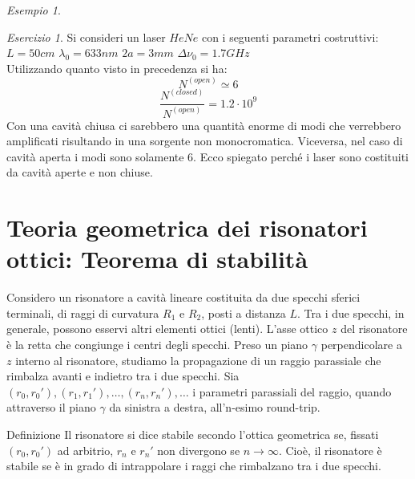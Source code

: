 \documentclass{book}
\def \D {\Delta}
\def \l {\lambda}
\theoremstyle{remark}
\newtheorem{example}{Esempio}[section]
\newtheorem{exercise}{Esercizio}[chapter]
\begin{document}
\begin{example}
\begin{exercise}
Si consideri un laser $HeNe$ con i seguenti parametri costruttivi:\\
$L = 50 cm$ $\l_0 = 633 nm$ $2a = 3 mm$ $\D\nu_0 = 1.7GHz$\\
Utilizzando quanto visto in precedenza si ha:
\begin{equation*}
N^{(open)} \simeq 6
\end{equation*}
\begin{equation*}
\frac{N^{(closed)}}{N^{(open)}} = 1.2 \cdot 10^9
\end{equation*}
Con una cavità chiusa ci sarebbero una quantità enorme di modi che verrebbero amplificati risultando in una sorgente non monocromatica. Viceversa, nel caso di cavità aperta i modi sono solamente 6. Ecco spiegato perché i laser sono costituiti da cavità aperte e non chiuse.
\end{exercise}
\end{example}

\section{Teoria geometrica dei risonatori ottici: Teorema di stabilità}
Considero un risonatore a cavità lineare costituita da due specchi sferici terminali, di raggi di curvatura $R_1$ e $R_2$, posti a distanza $L$. Tra i due specchi, in generale, possono esservi altri elementi ottici (lenti). L'asse ottico $z$ del risonatore è la retta che congiunge i centri degli specchi.
Preso un piano $\gamma$ perpendicolare a $z$ interno al risonatore, studiamo la propagazione di un raggio parassiale che rimbalza avanti e indietro tra i due specchi.
Sia $(r_0,r_0'), (r_1,r_1'), \dots, (r_n,r_n'), \dots$ i parametri parassiali del raggio, quando attraverso il piano $\gamma$ da sinistra a destra, all'n-esimo round-trip.

Definizione
Il risonatore si dice stabile secondo l'ottica geometrica se, fissati $(r_0,r_0')$ ad arbitrio, $r_n$ e $r_n'$ non divergono se $n\rightarrow\infty$. Cioè, il risonatore è stabile se è in grado di intrappolare i raggi che rimbalzano tra i due specchi.
\end{document}
